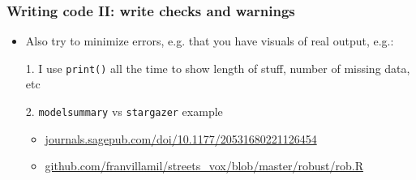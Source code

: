 \documentclass[aspectratio=43]{beamer}
\begin{document}


\begin{frame}
\frametitle{Writing code II: write checks and warnings}
\centering

\begin{itemize}
\item Also try to minimize errors, e.g. that you have visuals of real output, e.g.:
\item[1.] I use \texttt{print()} all the time to show length of stuff, number of missing data, etc
\item[2.] \texttt{modelsummary} vs \texttt{stargazer} example
  \begin{itemize}
    \item \href{https://journals.sagepub.com/doi/10.1177/20531680221126454}{journals.sagepub.com/doi/10.1177/20531680221126454}
    \item \href{https://github.com/franvillamil/streets_vox/blob/master/robust/rob.R}{github.com/franvillamil/streets\_vox/blob/master/robust/rob.R}
  \end{itemize}
\end{itemize}

\end{frame}


\end{document}
